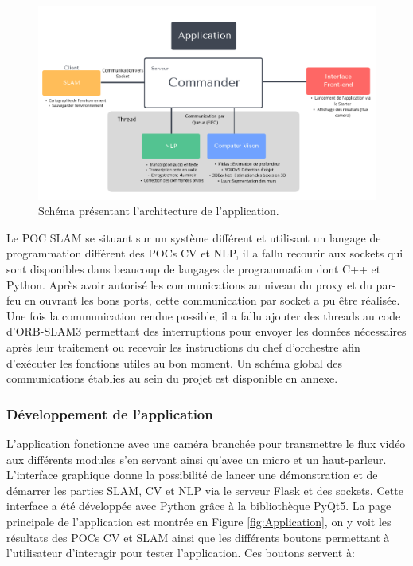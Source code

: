 \documentclass[11pt]{article}
\begin{document}
        \begin{figure}[hbt]  
          \includegraphics[width=\textwidth]{StructureApp.png}    
          \caption{Schéma présentant l'architecture de l'application.}
          \label{fig:Structure}
        \end{figure} 

        Le POC SLAM se situant sur un système différent et utilisant un langage de programmation différent des POCs CV et NLP, il a fallu
        recourir aux sockets qui sont disponibles dans beaucoup de langages de programmation dont C++ et Python. Après avoir autorisé les 
        communications au niveau du proxy et du par-feu en ouvrant les bons ports, cette communication par socket a pu être réalisée.
        Une fois la communication rendue possible, il a fallu ajouter des threads au code d'ORB-SLAM3 permettant des interruptions
        pour envoyer les données nécessaires après leur traitement ou recevoir les instructions du chef d'orchestre
        afin d'exécuter les fonctions utiles au bon moment. Un schéma global des communications établies au sein du projet est disponible en 
        annexe.


      \subsubsection{Développement de l'application}         
        L'application fonctionne avec une caméra branchée pour transmettre le flux vidéo aux différents modules s'en servant ainsi qu'avec
        un micro et un haut-parleur.  
        L'interface graphique donne la possibilité de lancer une démonstration et de démarrer les parties SLAM, CV et NLP via le serveur Flask 
        et des sockets. Cette interface a été développée avec Python grâce à la bibliothèque PyQt5. La page principale de l'application est
        montrée en Figure \ref{fig:Application}, on y voit les résultats des POCs CV et SLAM ainsi que les différents boutons permettant
        à l'utilisateur d'interagir pour tester l'application. Ces boutons servent à: 
\end{document}
